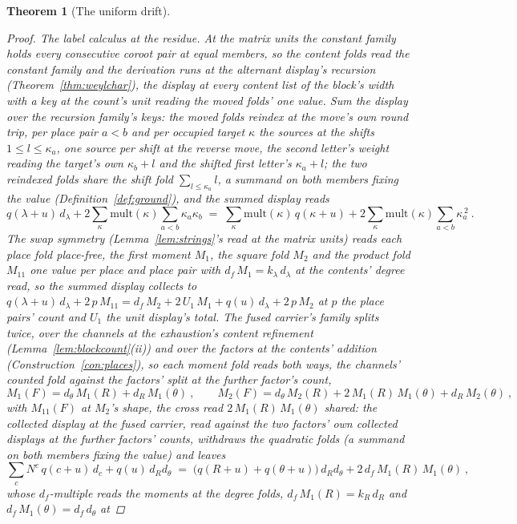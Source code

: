 \documentclass[11pt]{article}
\newtheorem{theorem}{Theorem}
\theoremstyle{definition}
\begin{document}
\begin{theorem}[The uniform drift]
\begin{proof}
\emph{The label calculus at the residue.} At the matrix units the
constant family holds every consecutive coroot pair at equal
members, so the content folds read the constant family and the
derivation runs at the alternant display's recursion
(Theorem~\ref{thm:weylchar}), the display at every content list
of the block's width with a key at the count's unit reading the
moved folds' one value. Sum the display over the recursion
family's keys: the moved folds reindex at the move's own round
trip, per place pair $a<b$ and per occupied target $\kappa$ the
sources at the shifts $1\le l\le\kappa_a$, one source per
shift at the reverse move, the second letter's weight reading the
target's own $\kappa_b+l$ and the shifted first letter's
$\kappa_a+l$; the two reindexed folds share the shift fold
$\sum_{l\le\kappa_a}l$, a summand on both members fixing the
value (Definition~\ref{def:ground}), and the summed display reads
\[
q(\lambda+u)\,d_\lambda
+2\sum_\kappa\mathrm{mult}(\kappa)\sum_{a<b}\kappa_a\kappa_b
\;=\;\sum_\kappa\mathrm{mult}(\kappa)\,q(\kappa+u)
+2\sum_\kappa\mathrm{mult}(\kappa)\sum_{a<b}\kappa_a^{\,2}\ .
\]
The swap symmetry (Lemma~\ref{lem:strings}'s read at the matrix
units) reads each place fold place-free, the first moment
$M_1$, the square fold $M_2$ and the product fold $M_{11}$ one
value per place and place pair with
$d_f\,M_1=k_\lambda\,d_\lambda$
at the contents' degree read, so the summed display collects to
$q(\lambda+u)\,d_\lambda+2\,p\,M_{11}
=d_f\,M_2+2\,U_1\,M_1+q(u)\,d_\lambda+2\,p\,M_2$ at $p$ the
place pairs' count and $U_1$ the unit display's total. The fused
carrier's family splits twice, over the channels at the
exhaustion's content refinement (Lemma~\ref{lem:blockcount}(ii))
and over the factors at the contents' addition
(Construction~\ref{con:places}), so each moment fold reads both
ways, the channels' counted fold against the factors' split at
the further factor's count,
\[
M_1(F)=d_\theta\,M_1(R)+d_R\,M_1(\theta)\ ,\qquad
M_2(F)=d_\theta\,M_2(R)+2\,M_1(R)\,M_1(\theta)+d_R\,M_2(\theta)\ ,
\]
with $M_{11}(F)$ at $M_2$'s shape, the cross read
$2\,M_1(R)\,M_1(\theta)$ shared: the collected display at the
fused carrier, read against the two factors' own collected
displays at the further factors' counts, withdraws the quadratic
folds (a summand on both members fixing the value) and leaves
\[
\sum_cN^c\,q(c+u)\,d_c+q(u)\,d_Rd_\theta
\;=\;\big(q(R+u)+q(\theta+u)\big)\,d_Rd_\theta
+2\,d_f\,M_1(R)\,M_1(\theta)\ ,
\]
whose $d_f$-multiple reads the moments at the degree folds,
$d_f\,M_1(R)=k_R\,d_R$ and $d_f\,M_1(\theta)=d_f\,d_\theta$ at

\end{proof}
\end{theorem}
\end{document}
